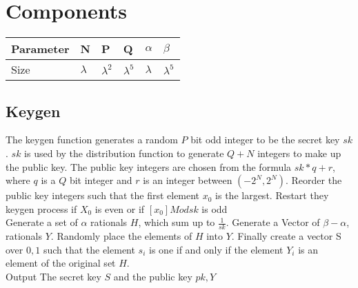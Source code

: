 \documentclass[letterpaper,11pt]{article} %
\begin{document}
\section*{Components}
% 
% 

\begin{center}
\begin{tabular}{  l | l | l | l | l | l }
\hline
Parameter & N & P & Q & $\alpha$ & $\beta$ \\ \hline
Size &  $\lambda$ & $\lambda ^2$  & $\lambda ^5$ & $\lambda$ & $\lambda ^5$  \\ \hline
\end{tabular}
\end{center}

\subsection*{Keygen}
The keygen function generates a random $P$ bit odd integer to be the secret key $sk$. $sk$ is used by the distribution function to generate $Q + N$ integers to make up the public key. The public key integers are chosen from
the formula $sk * q + r$, where $q$ is a $Q$ bit integer and $r$ is an integer between $(-2^N, 2^N).$ Reorder the public key integers such that the first element $x_0$ is the largest. Restart they keygen process if $X_0$ is even or if $[x_0] Mod sk$ is odd  \\

Generate a set of $\alpha$ rationals $H$, which sum up to $\frac{1}{sk}$. Generate a Vector of $\beta - \alpha$, rationals $Y.$ Randomly place the elements of $H$ into $Y$. Finally create a vector S over $0,1$ such that the element $s_i$ is one if and only if the element $Y_i$ is an element of the original set $H$.\\

Output The secret key $S$ and the public key $pk,Y$\\
\end{document}
